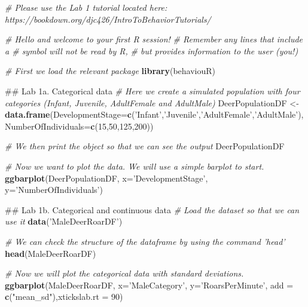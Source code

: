 \documentclass[]{book}
\newenvironment{Shaded}{\begin{snugshade}}{\end{snugshade}}
\newcommand{\CommentTok}[1]{\textcolor[rgb]{0.56,0.35,0.01}{\textit{#1}}}
\newcommand{\DataTypeTok}[1]{\textcolor[rgb]{0.13,0.29,0.53}{#1}}
\newcommand{\DecValTok}[1]{\textcolor[rgb]{0.00,0.00,0.81}{#1}}
\newcommand{\KeywordTok}[1]{\textcolor[rgb]{0.13,0.29,0.53}{\textbf{#1}}}
\newcommand{\NormalTok}[1]{#1}
\newcommand{\StringTok}[1]{\textcolor[rgb]{0.31,0.60,0.02}{#1}}
\begin{document}
\begin{Shaded}
\begin{Highlighting}[]
\CommentTok{# Please use the Lab 1 tutorial located here: https://bookdown.org/djc426/IntroToBehaviorTutorials/}

\CommentTok{# Hello and welcome to your first R session!}
\CommentTok{# Remember any lines that include a # symbol will not be read by R, }
\CommentTok{# but provides information to the user (you!)}

\CommentTok{# First we load the relevant package}
\KeywordTok{library}\NormalTok{(behaviouR)}

\NormalTok{## Lab 1a. Categorical data}
\CommentTok{# Here we create a simulated population with four categories (Infant, Juvenile, AdultFemale and AdultMale)}
\NormalTok{DeerPopulationDF <-}\StringTok{ }\KeywordTok{data.frame}\NormalTok{(}\DataTypeTok{DevelopmentStage=}\KeywordTok{c}\NormalTok{(}\StringTok{'Infant'}\NormalTok{,}\StringTok{'Juvenile'}\NormalTok{,}\StringTok{'AdultFemale'}\NormalTok{,}\StringTok{'AdultMale'}\NormalTok{),}
                               \DataTypeTok{NumberOfIndividuals=}\KeywordTok{c}\NormalTok{(}\DecValTok{15}\NormalTok{,}\DecValTok{50}\NormalTok{,}\DecValTok{125}\NormalTok{,}\DecValTok{200}\NormalTok{))}

\CommentTok{# We then print the object so that we can see the output}
\NormalTok{DeerPopulationDF}

\CommentTok{# Now we want to plot the data. We will use a simple barplot to start.}
\KeywordTok{ggbarplot}\NormalTok{(DeerPopulationDF, }\DataTypeTok{x=}\StringTok{'DevelopmentStage'}\NormalTok{, }\DataTypeTok{y=}\StringTok{'NumberOfIndividuals'}\NormalTok{)}


\NormalTok{## Lab 1b. Categorical and continuous data}
\CommentTok{# Load the dataset so that we can use it }
\KeywordTok{data}\NormalTok{(}\StringTok{'MaleDeerRoarDF'}\NormalTok{)}

\CommentTok{# We can check the structure of the dataframe by using the command 'head'}
\KeywordTok{head}\NormalTok{(MaleDeerRoarDF)}

\CommentTok{# Now we will plot the categorical data with standard deviations. }
\KeywordTok{ggbarplot}\NormalTok{(MaleDeerRoarDF, }\DataTypeTok{x=}\StringTok{'MaleCategory'}\NormalTok{, }\DataTypeTok{y=}\StringTok{'RoarsPerMinute'}\NormalTok{, }
          \DataTypeTok{add =} \KeywordTok{c}\NormalTok{(}\StringTok{"mean_sd"}\NormalTok{),}\DataTypeTok{xtickslab.rt =} \DecValTok{90}\NormalTok{)}


\end{Highlighting}
\end{Shaded}
\end{document}
